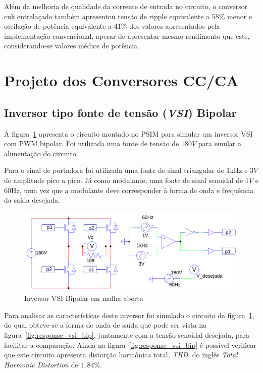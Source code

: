 \documentclass[
	12pt,				%
	openany,
	onseside,
	a4paper,			%
	english,			%
	french,				%
	spanish,			%
	brazil,				%
	]{abntex2}
\begin{document}
Além da melhoria de qualidade da corrente de entrada no circuito, o conversor cuk entrelaçado também apresentou tensão de ripple equivalente a 58\% menor e oscilação de potência equivalente a 41\% dos valores apresentados pela implementação convencional, apesar de apresentar mesmo rendimento que este, considerando-se valores médios de potência.

\section{Projeto dos Conversores CC/CA} \label{sec:met_conv_cc_ca}

\subsection{Inversor tipo fonte de tensão (\textit{VSI}) Bipolar}

A figura~\ref{fig:VSI_bip_circ} apresenta o circuito montado no PSIM para simular um inversor VSI com PWM bipolar. Foi utilizada uma fonte de tensão de $180V$ para emular a alimentação do circuito.

Para o sinal de portadora foi utilizada uma fonte de sinal triangular de 1kHz e $3V$ de amplitude pico a pico. Já como modulante, uma fonte de sinal senoidal de $1V$ e 60Hz, uma vez que a modulante deve corresponder à forma de onda e frequência da saída desejada.

\begin{figure}[htpb]%
	\centering%
		\includegraphics[width=0.8 \linewidth]{vsi_bipolar_psim_circ}
		\caption{Inversor VSI Bipolar em malha aberta}
		\label{fig:VSI_bip_circ}
\end{figure}

Para analisar as características deste inversor foi simulado o circuito da figura~\ref{fig:VSI_bip_circ}, do qual obteve-se a forma de onda de saída que pode ser vista na figura~\ref{fig:response_vsi_bip}, juntamente com a tensão senoidal desejada, para facilitar a comparação. Ainda na figura~\ref{fig:response_vsi_bip} é possível verificar que este circuito apresenta distorção harmônica total, \emph{THD}, do inglês \textit{Total Harmonic Distortion} de $1,84\%$.
\end{document}
